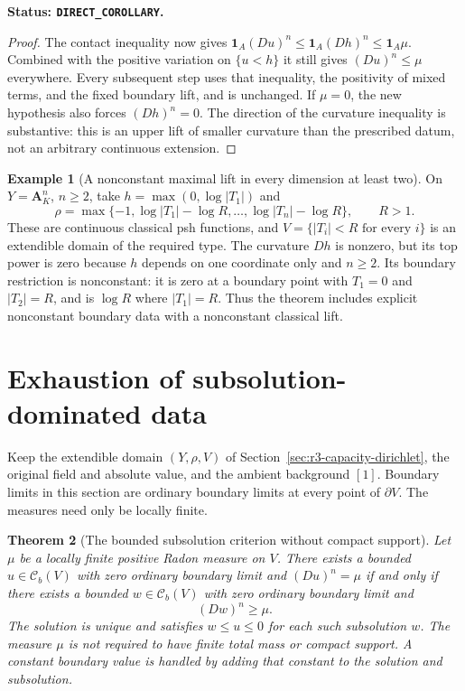 \documentclass[11pt,a4paper]{article}
\numberwithin{equation}{section}
\newtheorem{theorem}{Theorem}[section]
\theoremstyle{definition}
\newtheorem{example}[theorem]{Example}
\theoremstyle{remark}
\newcommand{\Cb}{\mathcal C_b}
\begin{document}
\noindent\textbf{Status: \texttt{DIRECT\_COROLLARY}.}

\begin{proof}
The contact inequality now gives
$\mathbf1_A(Du)^n\leq\mathbf1_A(Dh)^n\leq\mathbf1_A\mu$.
Combined with the positive variation on $\{u<h\}$ it still
gives $(Du)^n\leq\mu$ everywhere. Every subsequent step uses
that inequality, the positivity of mixed terms, and the fixed
boundary lift, and is unchanged. If $\mu=0$, the new hypothesis
also forces $(Dh)^n=0$. The direction of the curvature inequality
is substantive: this is an upper lift of smaller curvature than
the prescribed datum, not an arbitrary continuous extension.
\end{proof}

\begin{example}[A nonconstant maximal lift in every dimension at least two]
On $Y=\mathbf A_K^n$, $n\geq2$, take
$h=\max(0,\log|T_1|)$ and
\[
 \rho=\max\{-1,\log|T_1|-\log R,\ldots,
                       \log|T_n|-\log R\},\qquad R>1.
\]
These are continuous classical psh functions, and
$V=\{|T_i|<R\text{ for every }i\}$ is an extendible domain
of the required type. The curvature $Dh$ is nonzero, but its
top power is zero because $h$ depends on one coordinate only
and $n\geq2$. Its boundary restriction is nonconstant: it is
zero at a boundary point with $T_1=0$ and $|T_2|=R$, and is
$\log R$ where $|T_1|=R$. Thus the theorem includes explicit
nonconstant boundary data with a nonconstant classical lift.
\end{example}



\section{Exhaustion of subsolution-dominated data}
\label{sec:r3-subsolution-exhaustion}

Keep the extendible domain $(Y,\rho,V)$ of
Section~\ref{sec:r3-capacity-dirichlet}, the original field and
absolute value, and the ambient background $[1]$. Boundary limits
in this section are ordinary boundary limits at every point of
$\partial V$. The measures need only be locally finite.

\begin{theorem}[The bounded subsolution criterion without compact support]
\label{thm:r3-exhausted-subsolution-dirichlet}
Let $\mu$ be a locally finite positive Radon measure on $V$.
There exists a bounded $u\in\Cb(V)$ with zero ordinary boundary
limit and $(Du)^n=\mu$ if and only if there exists a bounded
$w\in\Cb(V)$ with zero ordinary boundary limit and
\[
 (Dw)^n\geq\mu.
\]
The solution is unique and satisfies $w\leq u\leq0$ for each
such subsolution $w$. The measure $\mu$ is not required to have
finite total mass or compact support. A constant boundary value
is handled by adding that constant to the solution and subsolution.
\end{theorem}
\end{document}
